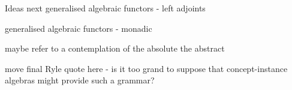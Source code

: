 \begin{frame}
\titlepage
{}
\end{frame}


\iffalse
\begin{frame}{test}
\begin{itemize}
\only<1->{\item Only 1-  One}
\only<2->{\item Only 2-  Two}
\onslide<3->{\item Onslide 3- Three}
\onslide<4->{\item Onslide 4- Four}
\end{itemize}
\end{frame}
\fi



\iffalse %

\fi %
\iffalse










\fi

\iffalse



\fi









\iffalse

\fi

\begin{frame}{Ideas next}
generalised algebraic functors - left adjoints

generalised algebraic functors - monadic

maybe refer to a contemplation of the absolute the abstract

move final Ryle quote here - is it too grand to suppose that concept-instance algebras might provide such a grammar?
\end{frame}


